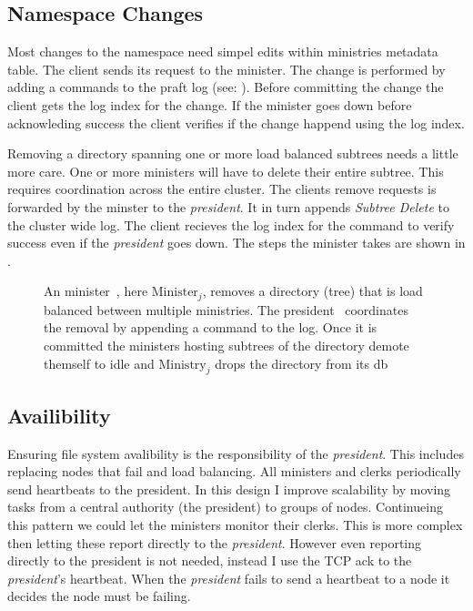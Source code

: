 \subsection*{Namespace Changes}
Most changes to the namespace need simpel edits within ministries metadata table. The client sends its request to the minister. The change is performed by adding a commands to the \ac{praft} log (see: ). Before committing the change the client gets the log index for the change. If the minister goes down before acknowleding success the client verifies if the change happend using the log index.

Removing a directory spanning one or more load balanced subtrees needs a little more care. One or more ministers will have to delete their entire subtree. This requires coordination across the entire cluster. The clients remove requests is forwarded by the minster to the \textit{president}. It in turn appends \textsl{Subtree Delete} to the cluster wide log. The client recieves the log index for the command to verify success even if the \textit{president} goes down. The steps the minister takes are shown in . 
%
\begin{figure}[htbp]
	\centering
	
	\caption{An minister~\amdsLeg{}, here $\text{Minister}_j$, removes a directory (tree) that is load balanced between multiple ministries. The president~\presidentLeg{} coordinates the removal by appending a command to the log. Once it is committed the ministers hosting subtrees of the directory demote themself to idle and $\text{Ministry}_j$ drops the directory from its db}
	\label{fig:rm}
\end{figure}
%
\subsection{Availibility}
Ensuring file system avalibility is the responsibility of the \textit{president}. This includes replacing nodes that fail and load balancing. All ministers and clerks periodically send heartbeats to the president. In this design I improve scalability by moving tasks from a central authority (the president) to groups of nodes. Continueing this pattern we could let the ministers monitor their clerks. This is more complex then letting these report directly to the \textit{president}. However even reporting directly to the president is not needed, instead I use the TCP ack to the \textit{president}'s \raft{} heartbeat. When the \textit{president} fails to send a \raft{} heartbeat to a node it decides the node must be failing.

